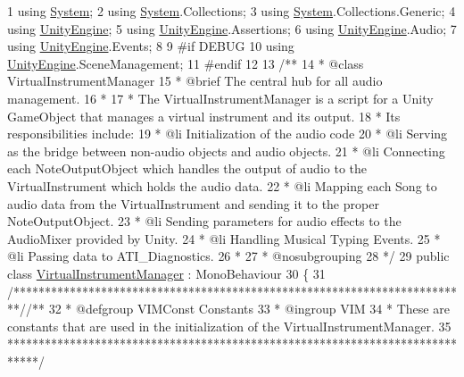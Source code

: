 \begin{DoxyCodeInclude}
1 \textcolor{keyword}{using} \hyperlink{namespace_system}{System};
2 \textcolor{keyword}{using} \hyperlink{namespace_system}{System}.Collections;
3 \textcolor{keyword}{using} \hyperlink{namespace_system}{System}.Collections.Generic;
4 \textcolor{keyword}{using} \hyperlink{namespace_unity_engine}{UnityEngine};
5 \textcolor{keyword}{using} \hyperlink{namespace_unity_engine}{UnityEngine}.Assertions;
6 \textcolor{keyword}{using} \hyperlink{namespace_unity_engine}{UnityEngine}.Audio;
7 \textcolor{keyword}{using} \hyperlink{namespace_unity_engine}{UnityEngine}.Events;
8 
9 \textcolor{preprocessor}{#if DEBUG}
10     \textcolor{keyword}{using} \hyperlink{namespace_unity_engine}{UnityEngine}.SceneManagement;
11 \textcolor{preprocessor}{#endif}
12 \textcolor{comment}{}
13 \textcolor{comment}{/**}
14 \textcolor{comment}{ * @class VirtualInstrumentManager}
15 \textcolor{comment}{ * @brief The central hub for all audio management.}
16 \textcolor{comment}{ * }
17 \textcolor{comment}{ * The VirtualInstrumentManager is a script for a Unity GameObject that manages a virtual instrument and
       its output.}
18 \textcolor{comment}{ * Its responsibilities include: }
19 \textcolor{comment}{ *     @li Initialization of the audio code }
20 \textcolor{comment}{ *     @li Serving as the bridge between non-audio objects and audio objects. }
21 \textcolor{comment}{ *     @li Connecting each NoteOutputObject which handles the output of audio to the VirtualInstrument
       which holds the audio data. }
22 \textcolor{comment}{ *     @li Mapping each Song to audio data from the VirtualInstrument and sending it to the proper
       NoteOutputObject. }
23 \textcolor{comment}{ *     @li Sending parameters for audio effects to the AudioMixer provided by Unity. }
24 \textcolor{comment}{ *     @li Handling Musical Typing Events. }
25 \textcolor{comment}{ *     @li Passing data to ATI\_Diagnostics. }
26 \textcolor{comment}{ *     }
27 \textcolor{comment}{ *     @nosubgrouping}
28 \textcolor{comment}{*/}
29 \textcolor{keyword}{public} \textcolor{keyword}{class }\hyperlink{class_virtual_instrument_manager}{VirtualInstrumentManager} : MonoBehaviour
30 \{
31     \textcolor{comment}{/*************************************************************************/}\textcolor{comment}{/** }
32 \textcolor{comment}{    * @defgroup VIMConst Constants}
33 \textcolor{comment}{    * @ingroup VIM}
34 \textcolor{comment}{    * These are constants that are used in the initialization of the VirtualInstrumentManager.}
35 \textcolor{comment}{    *****************************************************************************/}\textcolor{comment}{}

\end{DoxyCodeInclude}
